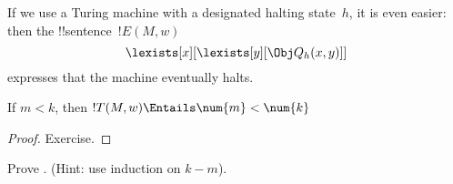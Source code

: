 \documentclass[../../../include/open-logic-section]{subfiles}
\begin{document}
If we use a Turing machine with a designated halting state~$h$, it
is even easier: then the !!{sentence}~$!E(M, w)$
\[
\lexists[x][\lexists[y][\Obj Q_h(x, y)]]
\]
expresses that the machine eventually halts.

\begin{prop}
If $m < k$, then $!T(M, w) \Entails \num{m} < \num{k}$
\end{prop}

\begin{proof}
Exercise.
\end{proof}

\begin{prob}
Prove .
(Hint: use induction on $k-m$).
\end{prob}
\end{document}
